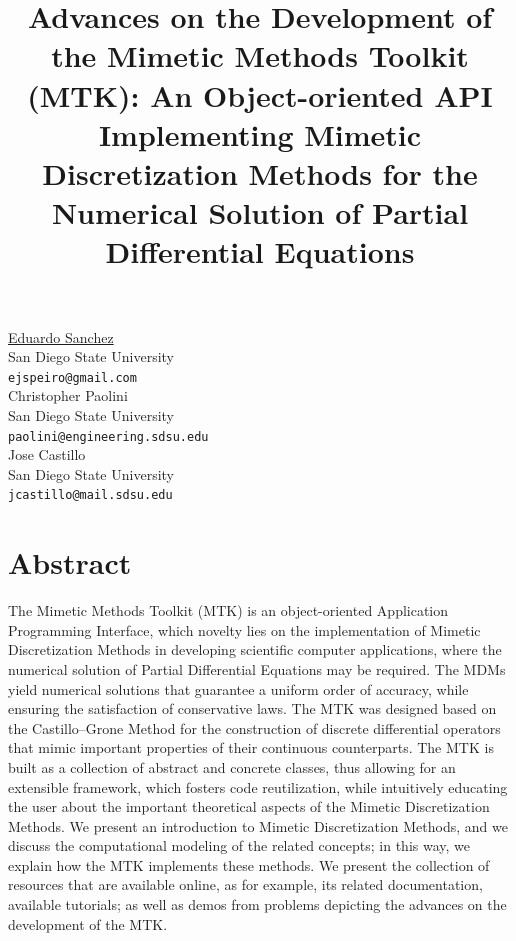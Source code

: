 \documentclass[article, A4, 11pt]{llncs}%
\begin{document}
\title{Advances on the Development of the Mimetic Methods Toolkit (MTK): An Object-oriented API Implementing Mimetic Discretization Methods for the Numerical Solution of Partial Differential Equations}
 \author{} \institute{}
\maketitle
\begin{center}
{\large \underline{Eduardo Sanchez}}\\
San Diego State University\\
{\tt ejspeiro@gmail.com}
\\ \vspace{4mm}
{\large Christopher Paolini}\\
San Diego State University\\
{\tt paolini@engineering.sdsu.edu}
\\ \vspace{4mm}
{\large Jose Castillo}\\
San Diego State University\\
{\tt jcastillo@mail.sdsu.edu}
\end{center}

\section*{Abstract}
The  Mimetic Methods Toolkit (MTK) is an object-oriented Application Programming Interface, which novelty lies on the implementation of Mimetic Discretization Methods in developing scientific computer applications, where the numerical solution of Partial Differential Equations may be required. The MDMs yield numerical solutions that guarantee a uniform order of accuracy, while ensuring the satisfaction of conservative laws. The MTK was designed based on the Castillo–Grone Method for the construction of discrete differential operators that mimic important properties of their continuous counterparts. The MTK is built as a collection of abstract and concrete classes, thus allowing for an extensible framework, which fosters code reutilization, while intuitively educating the user about the important theoretical aspects of the Mimetic Discretization Methods. We present an introduction to Mimetic Discretization Methods, and we discuss the computational modeling of the related concepts; in this way, we explain how the MTK implements these methods. We present the collection of resources that are available online, as for example, its related documentation, available tutorials; as well as demos from problems depicting the advances on the development of the MTK.
\end{document}
